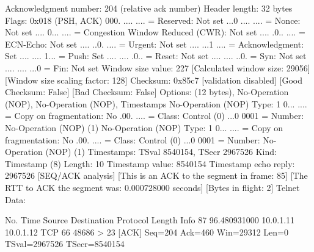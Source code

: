    Acknowledgment number: 204    (relative ack number)
    Header length: 32 bytes
    Flags: 0x018 (PSH, ACK)
        000. .... .... = Reserved: Not set
        ...0 .... .... = Nonce: Not set
        .... 0... .... = Congestion Window Reduced (CWR): Not set
        .... .0.. .... = ECN-Echo: Not set
        .... ..0. .... = Urgent: Not set
        .... ...1 .... = Acknowledgment: Set
        .... .... 1... = Push: Set
        .... .... .0.. = Reset: Not set
        .... .... ..0. = Syn: Not set
        .... .... ...0 = Fin: Not set
    Window size value: 227
    [Calculated window size: 29056]
    [Window size scaling factor: 128]
    Checksum: 0x85c7 [validation disabled]
        [Good Checksum: False]
        [Bad Checksum: False]
    Options: (12 bytes), No-Operation (NOP), No-Operation (NOP), Timestamps
        No-Operation (NOP)
            Type: 1
                0... .... = Copy on fragmentation: No
                .00. .... = Class: Control (0)
                ...0 0001 = Number: No-Operation (NOP) (1)
        No-Operation (NOP)
            Type: 1
                0... .... = Copy on fragmentation: No
                .00. .... = Class: Control (0)
                ...0 0001 = Number: No-Operation (NOP) (1)
        Timestamps: TSval 8540154, TSecr 2967526
            Kind: Timestamp (8)
            Length: 10
            Timestamp value: 8540154
            Timestamp echo reply: 2967526
    [SEQ/ACK analysis]
        [This is an ACK to the segment in frame: 85]
        [The RTT to ACK the segment was: 0.000728000 seconds]
        [Bytes in flight: 2]
Telnet
    Data: 

No.     Time           Source                Destination           Protocol Length Info
     87 96.480931000   10.0.1.11             10.0.1.12             TCP      66     48686 > 23 [ACK] Seq=204 Ack=460 Win=29312 Len=0 TSval=2967526 TSecr=8540154

